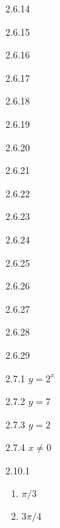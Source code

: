 \begin{Answer}{2.6.14}
\end{Answer}
\begin{Answer}{2.6.15}
\end{Answer}
\begin{Answer}{2.6.16}
\end{Answer}
\begin{Answer}{2.6.17}
\end{Answer}
\begin{Answer}{2.6.18}
\end{Answer}
\begin{Answer}{2.6.19}
\end{Answer}
\begin{Answer}{2.6.20}
	
\end{Answer}
\begin{Answer}{2.6.21}
	
\end{Answer}
\begin{Answer}{2.6.22}
\end{Answer}
\begin{Answer}{2.6.23}
\end{Answer}
\begin{Answer}{2.6.24}
\end{Answer}
\begin{Answer}{2.6.25}
\end{Answer}
\begin{Answer}{2.6.26}
\end{Answer}
\begin{Answer}{2.6.27}
\end{Answer}
\begin{Answer}{2.6.28}
\end{Answer}
\begin{Answer}{2.6.29}
\end{Answer}
\begin{Answer}{2.7.1}
$y=2^x$
\end{Answer}
\begin{Answer}{2.7.2}
$y=7$
\end{Answer}
\begin{Answer}{2.7.3}
$y=2$
\end{Answer}
\begin{Answer}{2.7.4}
$x\neq 0$
\end{Answer}
\begin{Answer}{2.10.1}
\begin{enumerate}
	\item	$\pi/3$
	\item	$3\pi/4$
\end{enumerate}
\end{Answer}
